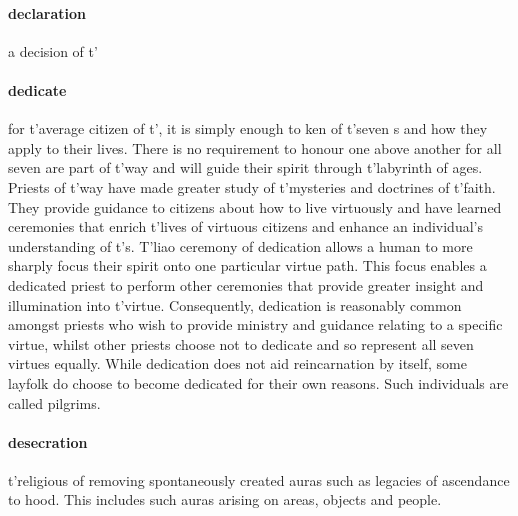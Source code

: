 \paragraph{declaration} a decision of t'\allowbreak {} %
\paragraph{dedicate} for t'\allowbreak average citizen of t'\allowbreak {}, it is simply enough to ken of t'\allowbreak seven s and how they apply to their lives. There is no requirement to honour one above another for all seven are part of t'\allowbreak way and will guide their spirit through t'\allowbreak labyrinth of ages. Priests of t'\allowbreak way have made greater study of t'\allowbreak mysteries and doctrines of t'\allowbreak faith. They provide guidance to citizens about how to live virtuously and have learned ceremonies that enrich t'\allowbreak lives of virtuous citizens and enhance an individual’s understanding of t'\allowbreak {}s. T'liao ceremony of dedication allows a human to more sharply focus their spirit onto one particular virtue path. This focus enables a dedicated priest to perform other ceremonies that provide greater insight and illumination into t'\allowbreak virtue. Consequently, dedication is reasonably common amongst priests who wish to provide ministry and guidance relating to a specific virtue, whilst other priests choose not to dedicate and so represent all seven virtues equally. While dedication does not aid reincarnation by itself, some layfolk do choose to become dedicated for their own reasons. Such individuals are called pilgrims. 
\paragraph{desecration} t'\allowbreak religious  of removing spontaneously created auras such as legacies of ascendance to hood. This includes such auras arising on areas, objects and people.
